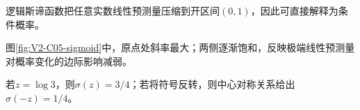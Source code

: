 \documentclass[UTF8,a4paper,11pt,openany]{ctexbook}
\begin{document}
\setcounter{page}{315}
\setcounter{chapter}{16}
\setcounter{figure}{0}
\pagestyle{headings}
\begin{keypointbox}
逻辑斯谛函数把任意实数线性预测量压缩到开区间$(0,1)$，因此可直接解释为条件概率。
\end{keypointbox}

图\ref{fig:V2-C05-sigmoid}中，原点处斜率最大；两侧逐渐饱和，反映极端线性预测量对概率变化的边际影响减弱。
\begin{example}[由线性预测量计算概率]
若$z=\log 3$，则$\sigma(z)=3/4$；若将符号反转，则中心对称关系给出$\sigma(-z)=1/4$。
\end{example}
\end{document}
